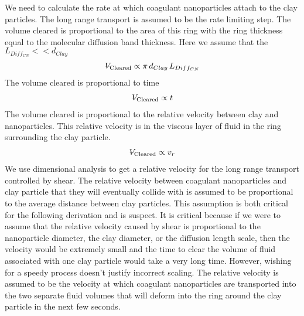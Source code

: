 \documentclass[letterpaper,10pt,english]{sphinxmanual}
\begin{document}
We need to calculate the rate at which coagulant nanoparticles attach to the clay particles. The long range transport is assumed to be the rate limiting step. The volume cleared is proportional to the area of this ring with the ring thickness equal to the molecular diffusion band thickness. Here we assume that the \(L_{Diff_{CN}} << d_{Clay}\)
\begin{equation}\label{equation:Rapid_Mix/RM_Theory_and_Future_Work:Rapid_Mix/RM_Theory_and_Future_Work:2}
\begin{split}{\rlap{\kern.08em--}V_{\rm{Cleared}}} \propto \pi \, d_{Clay} \, L_{Diff_{CN}}\end{split}
\end{equation}
The volume cleared is proportional to time
\begin{equation}\label{equation:Rapid_Mix/RM_Theory_and_Future_Work:Rapid_Mix/RM_Theory_and_Future_Work:3}
\begin{split}{\rlap{\kern.08em--}V_{\rm{Cleared}}} \propto t\end{split}
\end{equation}
The volume cleared is proportional to the relative velocity between clay and nanoparticles. This relative velocity is in the viscous layer of fluid in the ring surrounding the clay particle.
\begin{equation}\label{equation:Rapid_Mix/RM_Theory_and_Future_Work:Rapid_Mix/RM_Theory_and_Future_Work:4}
\begin{split}{\rlap{\kern.08em--}V_{\rm{Cleared}}} \propto v_r\end{split}
\end{equation}
We use dimensional analysis to get a relative velocity for the long range transport controlled by shear. The relative velocity between coagulant nanoparticles and clay particle that they will eventually collide with is assumed to be proportional to the average distance between clay particles. This assumption is both critical for the following derivation and is suspect. It is critical because if we were to assume that the relative velocity caused by shear is proportional to the nanoparticle diameter, the clay diameter, or the diffusion length scale, then the velocity would be extremely small and the time to clear the volume of fluid associated with one clay particle would take a very long time. However, wishing for a speedy process doesn’t justify incorrect scaling. The relative velocity is assumed to be the velocity at which coagulant nanoparticles are transported into the two separate fluid volumes that will deform into the ring around the clay particle in the next few seconds.
\end{document}
